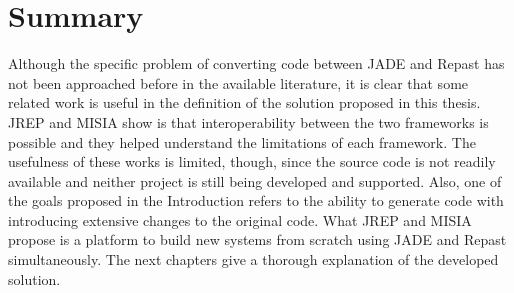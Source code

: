 

\section{Summary}
Although the specific problem of converting code between JADE and Repast has not been approached before in the available literature, it is clear that some related work is useful in the definition of the solution proposed in this thesis. JREP and MISIA show is that interoperability between the two frameworks is possible and they helped understand the limitations of each framework. The usefulness of these works is limited, though, since the source code is not readily available and neither project is still being developed and supported. Also, one of the goals proposed in the Introduction refers to the ability to generate code with introducing extensive changes to the original code. What JREP and MISIA propose is a platform to build new systems from scratch using JADE and Repast simultaneously. The next chapters give a thorough explanation of the developed solution.